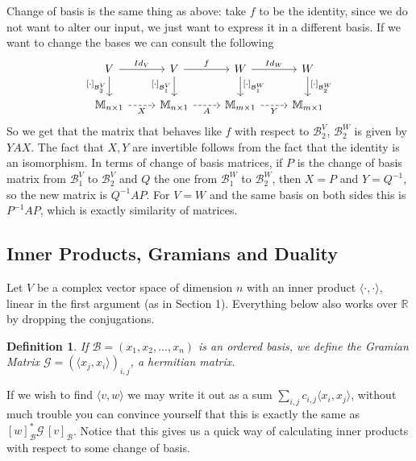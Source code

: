 \documentclass[12pt]{article}
\theoremstyle{breakplain}
\theoremstyle{breakdef}
\newtheorem{definition}[theorem]{Definition}
\theoremstyle{remark}
\begin{document}
Change of basis is the same thing as above: take $f$ to be the identity, since we do not want to alter our input, we just want to express it in a different basis. If we want to change the bases we can consult the following \[\begin{tikzcd}
	V & V & W & W \\
	{\mathbb{M}_{n\times1}} & {\mathbb{M}_{n\times1}} & {\mathbb{M}_{m\times1}} & {\mathbb{M}_{m\times1}}
	\arrow["{Id_V}", from=1-1, to=1-2]
	\arrow["{[\cdot]_{\mathcal{B}^V_2}}"', from=1-1, to=2-1]
	\arrow["f", from=1-2, to=1-3]
	\arrow["{[\cdot]_{\mathcal{B}^V_1}}"', from=1-2, to=2-2]
	\arrow["{Id_W}", from=1-3, to=1-4]
	\arrow["{[\cdot]_{\mathcal{B}^W_1}}", from=1-3, to=2-3]
	\arrow["{[\cdot]_{\mathcal{B}^W_2}}", from=1-4, to=2-4]
	\arrow["X"', dashed, from=2-1, to=2-2]
	\arrow["A"', dashed, from=2-2, to=2-3]
	\arrow["Y"', dashed, from=2-3, to=2-4]
\end{tikzcd}\]
So we get that the matrix that behaves like $f$ with respect to $\mathcal{B}^V_2$, $\mathcal{B}^W_2$ is given by $YAX$.
The fact that $X,Y$ are invertible follows from the fact that the identity is an isomorphism. In terms of change of basis matrices, if $P$ is the change of basis matrix from $\mathcal{B}^V_1$ to $\mathcal{B}^V_2$ and $Q$ the one from $\mathcal{B}^W_1$ to $\mathcal{B}^W_2$, then $X=P$ and $Y=Q^{-1}$, so the new matrix is $Q^{-1}AP$. For $V=W$ and the same basis on both sides this is $P^{-1}AP$, which is exactly similarity of matrices.
\subsection{Inner Products, Gramians and Duality}
Let $V$ be a complex vector space of dimension $n$ with an inner product $\langle\cdot,\cdot\rangle$, linear in the first argument (as in Section 1). Everything below also works over $\mathbb{R}$ by dropping the conjugations.

\begin{definition}
    If $\mathcal{B}=(x_1,x_2,\ldots,x_n)$ is an ordered basis, we define the \emph{Gramian Matrix} $\mathscr{G}=(\langle x_j,x_i \rangle)_{i,j}$, a hermitian matrix.
\end{definition}
If we wish to find $\langle v,w\rangle$ we may write it out as a sum $\sum_{i,j}c_{i,j}\langle x_i,x_j \rangle$, without much trouble you can convince yourself that this is exactly the same as $[w]_{\mathcal{B}}^* \mathscr{G}\,[v]_{\mathcal{B}}$.
Notice that this gives us a quick way of calculating inner products with respect to some change of basis.
\end{document}
